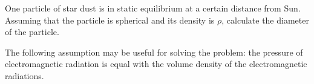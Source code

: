 One particle of star dust is in static equilibrium at a certain distance from
Sun. Assuming that the particle is spherical and its density is $\rho$,
calculate the diameter of the particle.

The following assumption may be useful for solving the problem: the pressure
of electromagnetic radiation is equal with the volume density of the
electromagnetic radiations.
